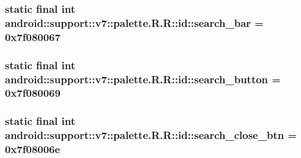 \hypertarget{classandroid_1_1support_1_1v7_1_1palette_1_1_r_1_1id_3c116d3511032c3521a6ae8ebea35097}{
\subsubsection[{search\_\-bar}]{\setlength{\rightskip}{0pt plus 5cm}static final int android::support::v7::palette.R.R::id::search\_\-bar = 0x7f080067}}
\label{classandroid_1_1support_1_1v7_1_1palette_1_1_r_1_1id_3c116d3511032c3521a6ae8ebea35097}


\hypertarget{classandroid_1_1support_1_1v7_1_1palette_1_1_r_1_1id_404d5842da462e9c289f8b4fac73ed42}{
\subsubsection[{search\_\-button}]{\setlength{\rightskip}{0pt plus 5cm}static final int android::support::v7::palette.R.R::id::search\_\-button = 0x7f080069}}
\label{classandroid_1_1support_1_1v7_1_1palette_1_1_r_1_1id_404d5842da462e9c289f8b4fac73ed42}


\hypertarget{classandroid_1_1support_1_1v7_1_1palette_1_1_r_1_1id_c7832b7e12d47ac022351ffa37b48494}{
\subsubsection[{search\_\-close\_\-btn}]{\setlength{\rightskip}{0pt plus 5cm}static final int android::support::v7::palette.R.R::id::search\_\-close\_\-btn = 0x7f08006e}}
\label{classandroid_1_1support_1_1v7_1_1palette_1_1_r_1_1id_c7832b7e12d47ac022351ffa37b48494}


